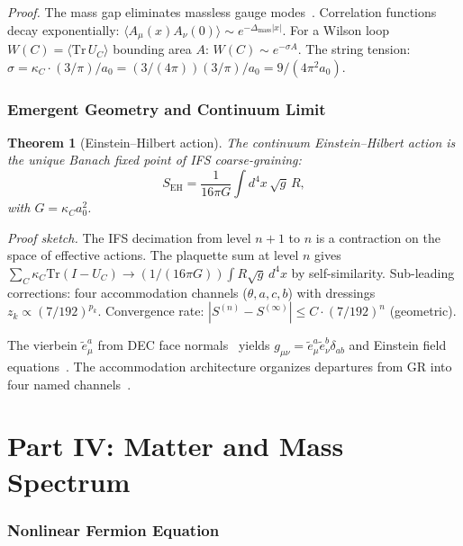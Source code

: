 \documentclass[11pt,twocolumn]{article}
\newtheorem{theorem}{Theorem}
\begin{document}
\textit{Proof.}
The mass gap eliminates massless gauge modes~\cite{wilson1974}.
Correlation functions decay exponentially: $\langle A_\mu(x)A_\nu(0)\rangle\sim e^{-\Delta_{\mathrm{mass}}|x|}$.
For a Wilson loop $W(C)=\langle\mathrm{Tr}\,U_C\rangle$ bounding area $A$: $W(C)\sim e^{-\sigma A}$.
The string tension: $\sigma=\kappa_C\cdot(3/\pi)/a_0=(3/(4\pi))(3/\pi)/a_0=9/(4\pi^2 a_0)$.

\section{Emergent Geometry and Continuum Limit}
\label{sec:geometry}

\begin{theorem}[Einstein--Hilbert action]
\label{thm:EH}
The continuum Einstein--Hilbert action is the unique Banach fixed point of IFS coarse-graining:
\begin{equation}
S_{\mathrm{EH}}=\frac{1}{16\pi G}\int d^4x\,\sqrt{g}\,R,
\label{eq:EH}
\end{equation}
with $G=\kappa_C a_0^2$.
\end{theorem}

\textit{Proof sketch.}
The IFS decimation from level $n{+}1$ to $n$ is a contraction on the space of effective actions.
The plaquette sum at level $n$ gives $\sum_C\kappa_C\mathrm{Tr}(I{-}U_C)\to(1/(16\pi G))\int R\sqrt{g}\,d^4x$ by self-similarity.
Sub-leading corrections: four accommodation channels ($\theta,a,c,b$) with dressings $z_k\propto(7/192)^{p_k}$.
Convergence rate: $|S^{(n)}-S^{(\infty)}|\leq C\cdot(7/192)^n$ (geometric).

The vierbein $\tilde{e}^a_\mu$ from DEC face normals~\cite{hirani2003} yields $g_{\mu\nu}=\tilde{e}^a_\mu\tilde{e}^b_\nu\delta_{ab}$ and Einstein field equations~\cite{einstein1915}.
The accommodation architecture organizes departures from GR into four named channels~\cite{mayes2026grav}.


\part*{Part IV: Matter and Mass Spectrum}

\section{Nonlinear Fermion Equation}
\label{sec:fermion}
\end{document}
